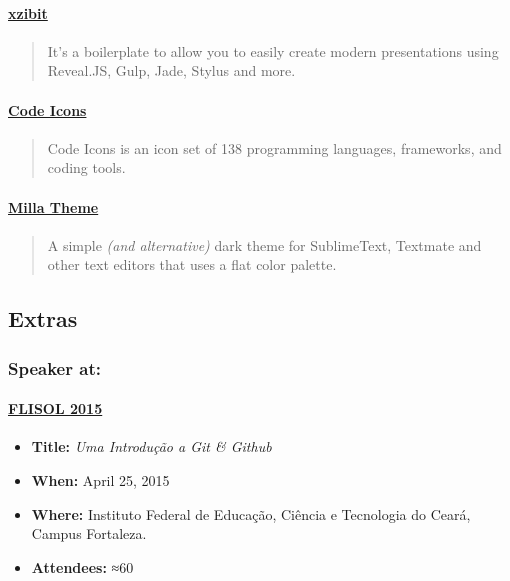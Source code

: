 \documentclass[]{article}
\providecommand{\tightlist}{%
  \setlength{\itemsep}{0pt}\setlength{\parskip}{0pt}}
\let\oldparagraph\paragraph
\renewcommand{\paragraph}[1]{\oldparagraph{#1}\mbox{}}
\begin{document}
\paragraph{\texorpdfstring{\href{https://github.com/mabrasil/xzibit}{xzibit}}{xzibit}}\label{xzibit}

\begin{quote}
It's a boilerplate to allow you to easily create modern presentations
using Reveal.JS, Gulp, Jade, Stylus and more.
\end{quote}

\paragraph{\texorpdfstring{\href{https://github.com/mabrasil/codeicons}{Code
Icons}}{Code Icons}}\label{code-icons}

\begin{quote}
Code Icons is an icon set of 138 programming languages, frameworks, and
coding tools.
\end{quote}

\paragraph{\texorpdfstring{\href{https://github.com/mabrasil/milla-theme}{Milla
Theme}}{Milla Theme}}\label{milla-theme}

\begin{quote}
A simple \emph{(and alternative)} dark theme for SublimeText, Textmate
and other text editors that uses a flat color palette.
\end{quote}

\subsection{Extras}\label{extras}

\subsubsection{Speaker at:}\label{speaker-at}

\paragraph{\texorpdfstring{\href{http://flisolce.org/}{FLISOL
2015}}{FLISOL 2015}}\label{flisol-2015}

\begin{itemize}
\tightlist
\item
  \textbf{Title:} \emph{Uma Introdução a Git \& Github}
\item
  \textbf{When:} April 25, 2015
\item
  \textbf{Where:} Instituto Federal de Educação, Ciência e Tecnologia do
  Ceará, Campus Fortaleza.
\item
  \textbf{Attendees:} ≈60
\end{itemize}
\end{document}
